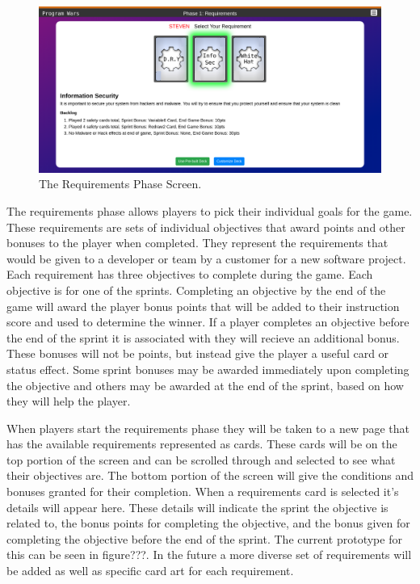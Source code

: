 \begin{figure}[ht]
	\centering
	\includegraphics[width=\textwidth]{images/requirement_screen.PNG}
	\caption{The Requirements Phase Screen.}
	\label{fig:requrements}
\end{figure}

The requirements phase allows players to pick their individual goals for the game.
These requirements are sets of individual objectives that award points and other
bonuses to the player when completed. They represent the requirements that would
be given to a developer or team by a customer for a new software project. Each
requirement has three objectives to complete during the game. Each objective is for
one of the sprints. Completing an objective by the end of the game will award the
player bonus points that will be added to their instruction score and used to determine
the winner. If a player completes an objective before the end of the sprint it is
associated with they will recieve an additional bonus. These bonuses will not be points,
but instead give the player a useful card or status effect. Some sprint bonuses may be
awarded immediately upon completing the objective and others may be awarded at the end
of the sprint, based on how they will help the player.

When players start the requirements phase they will be taken to a new page that has
the available requirements represented as cards. These cards will be on the top portion
of the screen and can be scrolled through and selected to see what their objectives are.
The bottom portion of the screen will give the conditions and bonuses granted for their
completion. When a requirements card is selected it's details will appear here. These
details will indicate the sprint the objective is related to, the bonus points for
completing the objective, and the bonus given for completing the objective before the
end of the sprint. The current prototype for this can be seen in figure???. In the future
a more diverse set of requirements will be added as well as specific card art for each
requirement.

